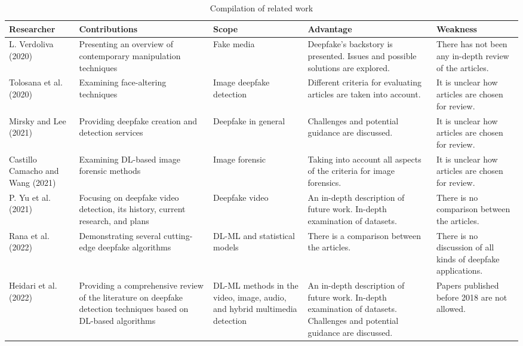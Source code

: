 \begin{table}[ht]
  \centering
  \caption{Compilation of related work}
  \small
  \begin{tabular}{|p{2cm}|p{3cm}|p{2.5cm}|p{3cm}|p{3cm}|}
    \hline
    \textbf{Researcher} & \textbf{Contributions} & \textbf{Scope} & \textbf{Advantage} & \textbf{Weakness} \\
    \hline
    L. Verdoliva (2020) & Presenting an overview of contemporary manipulation techniques & Fake media & Deepfake's backstory is presented. Issues and possible solutions are explored. & There has not been any in-depth review of the articles. \\
    \hline
    Tolosana et al. (2020) & Examining face-altering techniques & Image deepfake detection & Different criteria for evaluating articles are taken into account. & It is unclear how articles are chosen for review. \\
    \hline
    Mirsky and Lee (2021) & Providing deepfake creation and detection services & Deepfake in general & Challenges and potential guidance are discussed. & It is unclear how articles are chosen for review. \\
    \hline
    Castillo Camacho and Wang (2021) & Examining DL-based image forensic methods & Image forensic & Taking into account all aspects of the criteria for image forensics. & It is unclear how articles are chosen for review. \\
    \hline
    P. Yu et al. (2021) & Focusing on deepfake video detection, its history, current research, and plans & Deepfake video & An in-depth description of future work. In-depth examination of datasets. & There is no comparison between the articles. \\
    \hline
    Rana et al. (2022) & Demonstrating several cutting-edge deepfake algorithms & DL-ML and statistical models & There is a comparison between the articles. & There is no discussion of all kinds of deepfake applications. \\
    \hline
    Heidari et al. (2022) & Providing a comprehensive review of the literature on deepfake detection techniques based on DL-based algorithms & DL-ML methods in the video, image, audio, and hybrid multimedia detection & An in-depth description of future work. In-depth examination of datasets. Challenges and potential guidance are discussed. & Papers published before 2018 are not allowed.  \\
    \hline
  \end{tabular}
\end{table}

